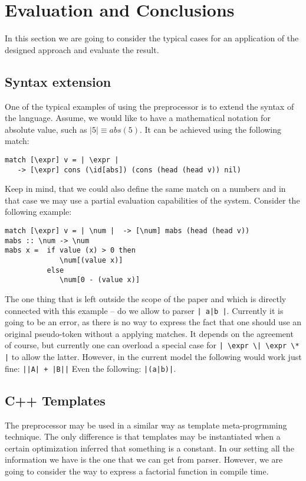 \section{Evaluation and Conclusions}

In this section we are going to consider the typical cases for an
application of the designed approach and evaluate the result.

\subsection{Syntax extension}

One of the typical examples of using the preprocessor is to extend the
syntax of the language.  Assume, we would like to have a mathematical 
notation for absolute value, such as $\left|5\right| \equiv abs(5)$. 
It can be achieved using the following match:
\begin{verbatim}
match [\expr] v = | \expr | 
   -> [\expr] cons (\id[abs]) (cons (head (head v)) nil)
\end{verbatim}

Keep in mind, that we could also define the same match on a numbers
and in that case we may use a partial evaluation capabilities of 
the system.  Consider the following example:
\begin{verbatim}
match [\expr] v = | \num |  -> [\num] mabs (head (head v))
mabs :: \num -> \num
mabs x =  if value (x) > 0 then
             \num[(value x)]
          else
             \num[0 - (value x)]
\end{verbatim}

The one thing that is left outside the scope of the paper and which 
is directly connected with this example -- do we allow to parser 
\verb/| a|b |/.  Currently it is going to be an error, as there is
no way to express the fact that one should use an original pseudo-token
without a applying matches.  It depends on the agreement of course,
but currently one can overload a special case for 
\verb/| \expr \| \expr \* |/ to allow the latter.  However, in the
current model the following would work just fine: \verb/||A| + |B||/
Even the following: \verb/|(a|b)|/.

\subsection{C++ Templates}

The preprocessor may be used in a similar way as template
meta-progrmming technique.  The only difference is that templates
may be instantiated when a certain optimization inferred that 
something is a constant.  In our setting all the information 
we have is the one that we can get from parser.  However, we
are going to consider the way to express a factorial function
in compile time.

